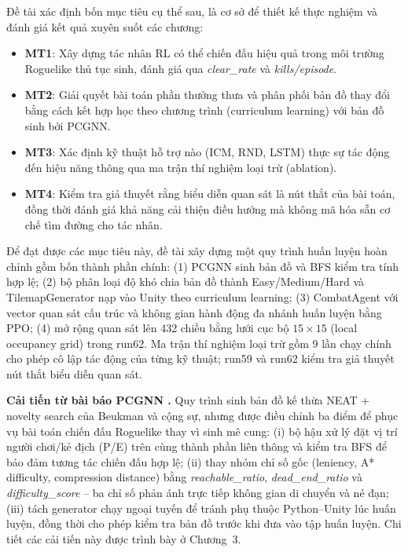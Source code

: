 \vspace{0.5cm}

Đề tài xác định bốn mục tiêu cụ thể sau, là cơ sở để thiết kế thực nghiệm và đánh giá kết quả xuyên suốt các chương:

\renewcommand{\labelitemi}{$-$}
\begin{itemize}
    \item \textbf{MT1}: Xây dựng tác nhân RL có thể chiến đấu hiệu quả trong môi trường Roguelike thủ tục sinh, đánh giá qua \textit{clear\_rate} và \textit{kills/episode}.
    \item \textbf{MT2}: Giải quyết bài toán phần thưởng thưa và phân phối bản đồ thay đổi bằng cách kết hợp học theo chương trình (curriculum learning) với bản đồ sinh bởi PCGNN.
    \item \textbf{MT3}: Xác định kỹ thuật hỗ trợ nào (ICM, RND, LSTM) thực sự tác động đến hiệu năng thông qua ma trận thí nghiệm loại trừ (ablation).
    \item \textbf{MT4}: Kiểm tra giả thuyết rằng biểu diễn quan sát là nút thắt của bài toán, đồng thời đánh giá khả năng cải thiện điều hướng mà không mã hóa sẵn cơ chế tìm đường cho tác nhân.
\end{itemize}

\vspace{0.5cm}

Để đạt được các mục tiêu này, đề tài xây dựng một quy trình huấn luyện hoàn chỉnh gồm bốn thành phần chính: (1) PCGNN sinh bản đồ và BFS kiểm tra tính hợp lệ; (2) bộ phân loại độ khó chia bản đồ thành Easy/Medium/Hard và TilemapGenerator nạp vào Unity theo curriculum learning; (3) CombatAgent với vector quan sát cấu trúc và không gian hành động đa nhánh huấn luyện bằng PPO; (4) mở rộng quan sát lên 432 chiều bằng lưới cục bộ $15\times15$ (local occupancy grid) trong run62. Ma trận thí nghiệm loại trừ gồm 9 lần chạy chính cho phép cô lập tác động của từng kỹ thuật; run59 và run62 kiểm tra giả thuyết nút thắt biểu diễn quan sát.

\textbf{Cải tiến từ bài báo PCGNN \cite{Beukman2022}.} Quy trình sinh bản đồ kế thừa NEAT + novelty search của Beukman và cộng sự, nhưng được điều chỉnh ba điểm để phục vụ bài toán chiến đấu Roguelike thay vì sinh mê cung: (i) bộ hậu xử lý đặt vị trí người chơi/kẻ địch (P/E) trên cùng thành phần liên thông và kiểm tra BFS để bảo đảm tương tác chiến đấu hợp lệ; (ii) thay nhóm chỉ số gốc (leniency, A* difficulty, compression distance) bằng \emph{reachable\_ratio}, \emph{dead\_end\_ratio} và \emph{difficulty\_score} -- ba chỉ số phản ánh trực tiếp không gian di chuyển và né đạn; (iii) tách generator chạy ngoại tuyến để tránh phụ thuộc Python--Unity lúc huấn luyện, đồng thời cho phép kiểm tra bản đồ trước khi đưa vào tập huấn luyện. Chi tiết các cải tiến này được trình bày ở Chương~3.

